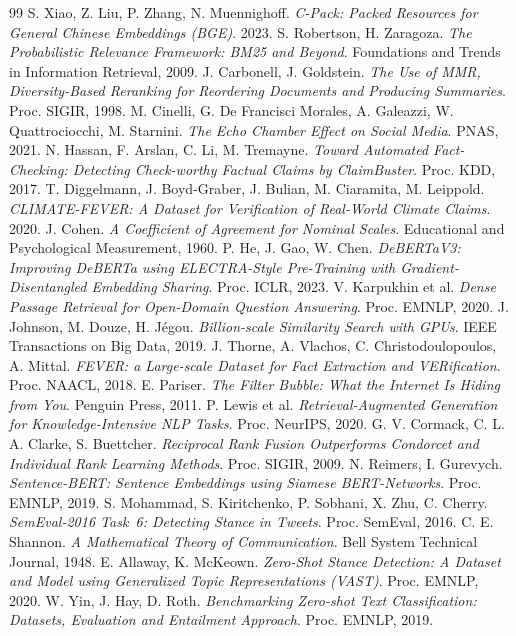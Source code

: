 \documentclass[11pt,a4paper]{report}
\begin{document}
\begin{thebibliography}{99}
 S. Xiao, Z. Liu, P. Zhang, N. Muennighoff. \emph{C-Pack: Packed Resources for General
  Chinese Embeddings (BGE)}. 2023.
 S. Robertson, H. Zaragoza. \emph{The Probabilistic Relevance Framework: BM25 and
  Beyond}. Foundations and Trends in Information Retrieval, 2009.
 J. Carbonell, J. Goldstein. \emph{The Use of MMR, Diversity-Based Reranking for
  Reordering Documents and Producing Summaries}. Proc. SIGIR, 1998.
 M. Cinelli, G. De Francisci Morales, A. Galeazzi, W. Quattrociocchi, M. Starnini.
  \emph{The Echo Chamber Effect on Social Media}. PNAS, 2021.
 N. Hassan, F. Arslan, C. Li, M. Tremayne. \emph{Toward Automated
  Fact-Checking: Detecting Check-worthy Factual Claims by ClaimBuster}. Proc. KDD, 2017.
 T. Diggelmann, J. Boyd-Graber, J. Bulian, M. Ciaramita, M. Leippold.
  \emph{CLIMATE-FEVER: A Dataset for Verification of Real-World Climate Claims}. 2020.
 J. Cohen. \emph{A Coefficient of Agreement for Nominal Scales}. Educational and
  Psychological Measurement, 1960.
 P. He, J. Gao, W. Chen. \emph{DeBERTaV3: Improving DeBERTa using ELECTRA-Style
  Pre-Training with Gradient-Disentangled Embedding Sharing}. Proc. ICLR, 2023.
 V. Karpukhin et al. \emph{Dense Passage Retrieval for Open-Domain Question Answering}.
  Proc. EMNLP, 2020.
 J. Johnson, M. Douze, H. Jégou. \emph{Billion-scale Similarity Search with GPUs}.
  IEEE Transactions on Big Data, 2019.
 J. Thorne, A. Vlachos, C. Christodoulopoulos, A. Mittal. \emph{FEVER: a Large-scale
  Dataset for Fact Extraction and VERification}. Proc. NAACL, 2018.
 E. Pariser. \emph{The Filter Bubble: What the Internet Is Hiding from You}.
  Penguin Press, 2011.
 P. Lewis et al. \emph{Retrieval-Augmented Generation for Knowledge-Intensive NLP
  Tasks}. Proc. NeurIPS, 2020.
 G. V. Cormack, C. L. A. Clarke, S. Buettcher. \emph{Reciprocal Rank Fusion Outperforms
  Condorcet and Individual Rank Learning Methods}. Proc. SIGIR, 2009.
 N. Reimers, I. Gurevych. \emph{Sentence-BERT: Sentence Embeddings using Siamese
  BERT-Networks}. Proc. EMNLP, 2019.
 S. Mohammad, S. Kiritchenko, P. Sobhani, X. Zhu, C. Cherry. \emph{SemEval-2016
  Task~6: Detecting Stance in Tweets}. Proc. SemEval, 2016.
 C. E. Shannon. \emph{A Mathematical Theory of Communication}. Bell System
  Technical Journal, 1948.
 E. Allaway, K. McKeown. \emph{Zero-Shot Stance Detection: A Dataset and Model using
  Generalized Topic Representations (VAST)}. Proc. EMNLP, 2020.
 W. Yin, J. Hay, D. Roth. \emph{Benchmarking Zero-shot Text Classification: Datasets,
  Evaluation and Entailment Approach}. Proc. EMNLP, 2019.
\end{thebibliography}
\end{document}
